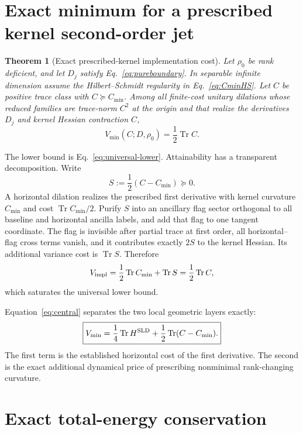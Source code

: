 \documentclass[aps,pra,preprint,nofootinbib]{revtex4-2}
\newtheorem{theorem}{Theorem}
\newcommand{\Tr}{\operatorname{Tr}}
\newcommand{\rhozero}{\rho_0}
\newcommand{\Vimpl}{V_{\rm impl}}
\newcommand{\Vmin}{V_{\min}}
\newcommand{\Cmin}{C_{\min}}
\newcommand{\Cker}{C}
\begin{document}
\section{Exact minimum for a prescribed kernel second-order jet}

\begin{theorem}[Exact prescribed-kernel implementation cost]
\label{thm:central}
Let $\rhozero$ be rank deficient, and let $D_j$ satisfy Eq.~\eqref{eq:pureboundary}. In separable infinite dimension assume the Hilbert--Schmidt regularity in Eq.~\eqref{eq:CminHS}. Let $\Cker$ be positive trace class with $\Cker\succeq\Cmin$. Among all finite-cost unitary dilations whose reduced families are trace-norm $C^2$ at the origin and that realize the derivatives $D_j$ and kernel Hessian contraction $\Cker$,
\begin{equation}
 \boxed{
 \Vmin(\Cker;D,\rhozero)
 =\frac12\Tr\Cker.
 }
 \label{eq:central}
\end{equation}
\end{theorem}

The lower bound is Eq.~\eqref{eq:universal-lower}. Attainability has a transparent decomposition. Write
\begin{equation}
 S:=\frac12(\Cker-\Cmin)\succeq0.
 \label{eq:Sdef}
\end{equation}
A horizontal dilation realizes the prescribed first derivative with kernel curvature $\Cmin$ and cost $\Tr\Cmin/2$. Purify $S$ into an ancillary flag sector orthogonal to all baseline and horizontal ancilla labels, and add that flag to one tangent coordinate. The flag is invisible after partial trace at first order, all horizontal--flag cross terms vanish, and it contributes exactly $2S$ to the kernel Hessian. Its additional variance cost is $\Tr S$. Therefore
\begin{equation}
 \Vimpl=\frac12\Tr\Cmin+\Tr S
 =\frac12\Tr\Cker,
\end{equation}
which saturates the universal lower bound.

Equation~\eqref{eq:central} separates the two local geometric layers exactly:
\begin{equation}
 \boxed{
 \Vmin
 =\frac14\Tr H^{\rm SLD}
 +\frac12\Tr(\Cker-\Cmin).
 }
 \label{eq:decomposition}
\end{equation}
The first term is the established horizontal cost of the first derivative. The second is the exact additional dynamical price of prescribing nonminimal rank-changing curvature.

\section{Exact total-energy conservation}
\end{document}
